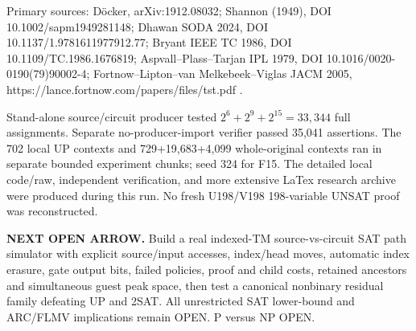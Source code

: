 \documentclass[11pt]{article}
\begin{document}
Primary sources: D\"ocker, arXiv:1912.08032; Shannon (1949), DOI 10.1002/sapm1949281148; Dhawan SODA 2024, DOI 10.1137/1.9781611977912.77; Bryant IEEE TC 1986, DOI 10.1109/TC.1986.1676819; Aspvall--Plass--Tarjan IPL 1979, DOI 10.1016/0020-0190(79)90002-4; Fortnow--Lipton--van Melkebeek--Viglas JACM 2005, https://lance.fortnow.com/papers/files/tst.pdf .

Stand-alone source/circuit producer tested $2^6+2^9+2^{15}=33{,}344$ full assignments. Separate no-producer-import verifier passed 35,041 assertions. The 702 local UP contexts and 729+19,683+4,099 whole-original contexts ran in separate bounded experiment chunks; seed 324 for F15. The detailed local code/raw, independent verification, and more extensive LaTex research archive were produced during this run. No fresh U198/V198 198-variable UNSAT proof was reconstructed.

\noindent\textbf{NEXT OPEN ARROW.} Build a real indexed-TM source-vs-circuit SAT path simulator with explicit source/input accesses, index/head moves, automatic index erasure, gate output bits, failed policies, proof and child costs, retained ancestors and simultaneous guest peak space, then test a canonical nonbinary residual family defeating UP and 2SAT. All unrestricted SAT lower-bound and ARC/FLMV implications remain OPEN. P versus NP OPEN.
\end{document}
